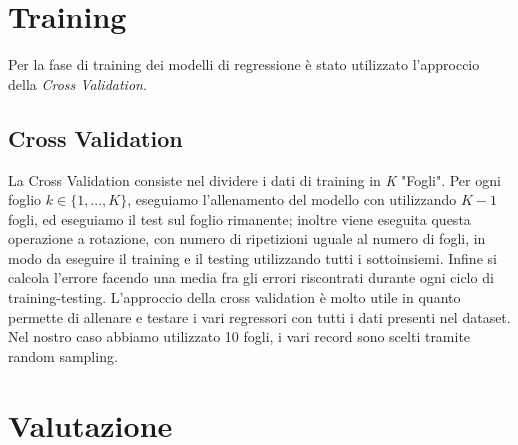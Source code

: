 \documentclass[10pt, a4paper, twocolumn]{article} %
\begin{document}
\section{Training}
Per la fase di training dei modelli di regressione è stato utilizzato l'approccio della \textit{Cross Validation}.
\subsection{Cross Validation}
La Cross Validation consiste nel dividere i dati di training in \textit{K} "Fogli". Per ogni foglio $k \in \lbrace1,..., K\rbrace$, eseguiamo l'allenamento del modello con utilizzando $K-1$ fogli, ed eseguiamo il test sul foglio rimanente; inoltre viene eseguita questa operazione a rotazione, con numero di ripetizioni uguale al numero di fogli, in modo da eseguire il training e il testing utilizzando tutti i sottoinsiemi. Infine si calcola l'errore facendo una media fra gli errori riscontrati durante ogni ciclo di training-testing. %
L'approccio della cross validation è molto utile in quanto permette di allenare e testare i vari regressori con tutti i dati presenti nel dataset.
Nel nostro caso abbiamo utilizzato 10 fogli, i vari record sono scelti tramite random sampling.

\section{Valutazione}


\printbibliography[title={Bibliography}] %

\end{document}
